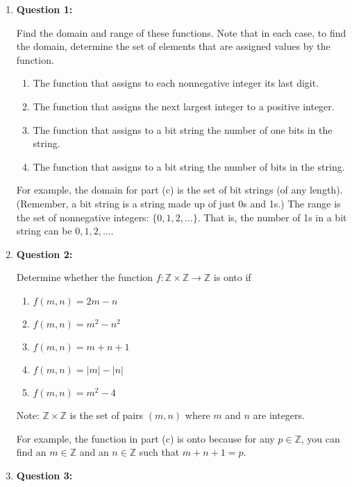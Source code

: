 \documentclass[11pt]{article}
\begin{document}
\begin{enumerate}

\item
\textbf{Question 1:}

Find the domain and range of these functions. Note that in each case, to find the domain, determine the set of elements that are assigned values by the function.

\begin{enumerate}[label=(\alph*)]
\item The function that assigns to each nonnegative integer its last digit.
\item The function that assigns the next largest integer to a positive integer.
\item The function that assigns to a bit string the number of one bits in the string.
\item The function that assigns to a bit string the number of bits in the string.
\end{enumerate}

For example, the domain for part (c) is the set of bit strings (of any length). (Remember, a bit string is a string made up of just 0s and 1s.) The range is the set of nonnegative integers: $\{0, 1, 2, \ldots\}$. That is, the number of 1s in a bit string can be $0,1,2,\ldots$.

\item
\textbf{Question 2:}

Determine whether the function $ f: \mathbb{Z} \times \mathbb{Z} \rightarrow \mathbb{Z} $ is onto if

\begin{enumerate}[label=(\alph*)]
\item $f(m,n) = 2m-n$
\item $f(m,n) = m^2 - n^2$
\item $f(m,n) = m + n + 1$
\item $f(m,n) = \left| m \right| - \left| n \right|$
\item $f(m,n) = m^2 - 4$
\end{enumerate}

Note: $ \mathbb{Z} \times \mathbb{Z}$ is the set of pairs $(m,n)$ where $m$ and $n$ are integers.

For example, the function in part (c) is onto because for any $p \in \mathbb{Z}$, you can find an $m \in \mathbb{Z}$ and an $n \in \mathbb{Z}$ such that $m + n + 1 = p$.

\item
\textbf{Question 3:}


\end{enumerate}
\end{document}
